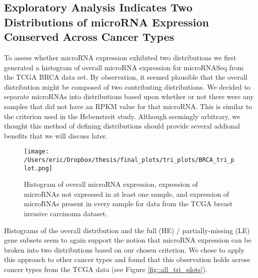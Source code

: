 \documentclass[12pt]{report}
\begin{document}
\subsection*{Exploratory Analysis Indicates Two Distributions of microRNA Expression Conserved Across Cancer Types}
To assess whether microRNA expression exhibited two distributions we first generated a histogram of overall microRNA expression
for microRNASeq from the TCGA BRCA data set. By observation, it seemed plausible that the overall distribution might be composed of two contributing distributions.
We decided to separate microRNAs into distributions based upon whether or not there were any samples that did not have an RPKM value for that microRNA.
This is similar to the criterion used in the Hebenstreit study. Although seemingly arbitrary, we thought this method of defining distributions should
provide several addional benefits that we will discuss later. %

\begin{figure}[H]
\centering
 \texttt{[image: /Users/eric/Dropbox/thesis/final\_plots/tri\_plots/BRCA\_tri\_plot.png]}
 \caption{Histogram of overall microRNA expression, expression of microRNAs not expressed in at least one sample, and expression of microRNAs present in every sample for data from
 the TCGA breast invasive carcinoma dataset.}
\end{figure}

  Histograms of the overall distribution and the full (HE) / partially-missing (LE) gene subsets seem to again support the notion that microRNA expression
can be broken into two distributions based on our chosen criterion. We chose to apply this approach to other cancer types and found that this observation
holds across cancer types from the TCGA data (see Figure \ref{fig::all_tri_plots}).
\end{document}
